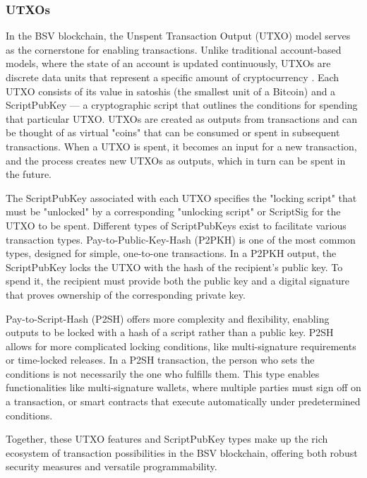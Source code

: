\subsubsection{UTXOs}
\label{subsec:utxos}
In the BSV blockchain, the Unspent Transaction Output (UTXO) model serves as the cornerstone for enabling transactions. Unlike traditional account-based models, where the state of an account is updated continuously, UTXOs are discrete data units that represent a specific amount of cryptocurrency \citep{antonopoulos2014mastering}. Each UTXO consists of its value in satoshis (the smallest unit of a Bitcoin) and a ScriptPubKey --- a cryptographic script that outlines the conditions for spending that particular UTXO. UTXOs are created as outputs from transactions and can be thought of as virtual "coins" that can be consumed or spent in subsequent transactions. When a UTXO is spent, it becomes an input for a new transaction, and the process creates new UTXOs as outputs, which in turn can be spent in the future.

The ScriptPubKey associated with each UTXO specifies the "locking script" that must be "unlocked" by a corresponding "unlocking script" or ScriptSig for the UTXO to be spent. Different types of ScriptPubKeys exist to facilitate various transaction types. Pay-to-Public-Key-Hash (P2PKH) \citep{p2pkh} is one of the most common types, designed for simple, one-to-one transactions. In a P2PKH output, the ScriptPubKey locks the UTXO with the hash of the recipient's public key. To spend it, the recipient must provide both the public key and a digital signature that proves ownership of the corresponding private key.

Pay-to-Script-Hash (P2SH) \citep{p2sh} offers more complexity and flexibility, enabling outputs to be locked with a hash of a script rather than a public key. P2SH allows for more complicated locking conditions, like multi-signature requirements or time-locked releases. In a P2SH transaction, the person who sets the conditions is not necessarily the one who fulfills them. This type enables functionalities like multi-signature wallets, where multiple parties must sign off on a transaction, or smart contracts that execute automatically under predetermined conditions.

Together, these UTXO features and ScriptPubKey types make up the rich ecosystem of transaction possibilities in the BSV blockchain, offering both robust security measures and versatile programmability.

